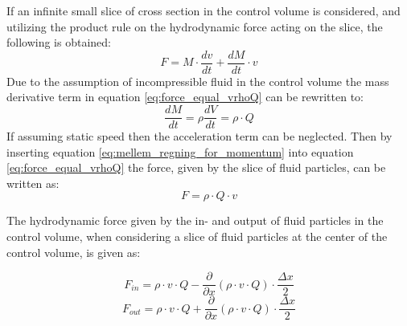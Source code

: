 If an infinite small slice of cross section in the control volume is considered, and utilizing the product rule on the hydrodynamic force acting on the slice, the following is obtained:  
\begin{equation}\label{eq:force_equal_vrhoQ}
	F= M \cdot \frac{dv}{dt} + \frac{dM}{dt} \cdot v 
\end{equation}
Due to the assumption of incompressible fluid in the control volume the mass derivative term in equation \ref{eq:force_equal_vrhoQ} can be rewritten to:
\begin{equation}\label{eq:mellem_regning_for_momentum}
	\frac{dM}{dt} = \rho \frac{dV}{dt} = \rho\cdot Q
\end{equation}
If assuming static speed then the acceleration term can be neglected. Then by inserting equation \ref{eq:mellem_regning_for_momentum} into equation \ref{eq:force_equal_vrhoQ} the force, given by the slice of fluid particles, can be written as:
\begin{equation}
	F = \rho\cdot Q\cdot v 
\end{equation}

The hydrodynamic force given by the in- and output of fluid particles in the control volume, when considering a slice of fluid particles at the center of the control volume,%
is given as:

\begin{equation}
	F_{in}= \rho \cdot v \cdot Q - \frac{\partial}{\partial x}(\rho \cdot v \cdot Q) \cdot \frac{\Delta x}{2}
\end{equation}
\begin{equation}
	F_{out} = \rho \cdot v \cdot Q + \frac{\partial}{\partial x}(\rho \cdot v \cdot Q) \cdot \frac{\Delta x}{2}
\end{equation}

